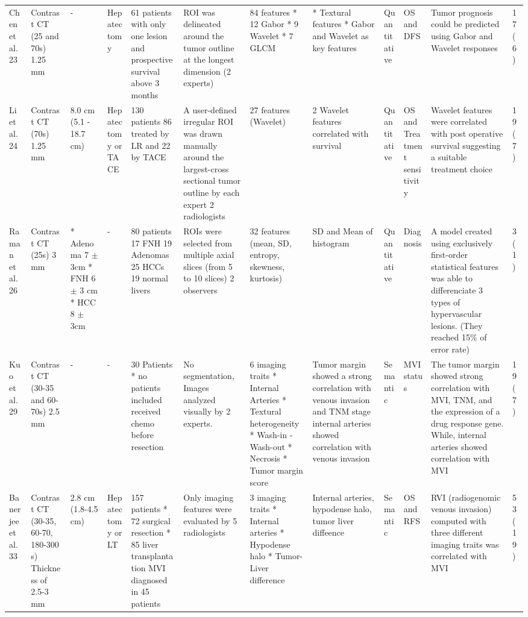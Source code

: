 \begin{landscape}
\begin{longtable}{p{2cm}|p{1.5cm}p{1cm}p{2cm}p{2cm}p{2cm}p{2cm}p{2cm}p{2cm}p{1.5cm}p{2cm}p{1cm}}
Chen et al.  23 &Contrast CT (25 and 70s) 1.25 mm &- &Hepatectomy &61 patients with only one lesion and prospective survival above 3 months &ROI was delineated around the tumor outline at the longest dimension (2 experts) &84 features * 12 Gabor * 9 Wavelet * 7 GLCM &* Textural features * Gabor and Wavelet as key features &Quantitative &OS and DFS &Tumor prognosis could be predicted using Gabor and Wavelet responses &17 (6) \\
Li et al.  24 &Contrast CT (70s) 1.25 mm &8.0 cm (5.1 - 18.7 cm) &Hepatectomy or TACE &130 patients 86 treated by LR and 22 by TACE &A user-defined irregular ROI was drawn manually around the largest-cross sectional tumor outline by each expert 2 radiologists &27 features (Wavelet) &2 Wavelet features correlated with survival &Quantitative &OS and Treatment sensitivity &Wavelet features were correlated with post operative survival suggesting a suitable treatment choice &19 (7) \\
Raman et al.  26 &Contrast CT (25s) 3 mm &* Adenoma 7 $ \pm $ 3cm * FNH 6 $ \pm $ 3 cm * HCC 8 $ \pm $ 3cm &- &80 patients 17 FNH 19 Adenomas 25 HCCs 19 normal livers &ROIs were selected from multiple axial slices (from 5 to 10 slices) 2 observers &32 features (mean, SD, entropy, skewness, kurtosis) & SD and Mean of histogram &Quantitative &Diagnosis &A model created using exclusively first-order statistical features was able to differenciate 3 types of hypervascular lesions. (They reached 15\% of error rate) &3 (1) \\
Kuo et al.  29 &Contrast CT (30-35 and 60-70s) 2.5 mm &- &- &30 Patients * no patients included received chemo before resection &No segmentation, Images analyzed visually by 2 experts. &6 imaging traits * Internal Arteries * Textural heterogeneity * Wash-in - Wash-out * Necrosis * Tumor margin score &Tumor margin showed a strong correlation with venous invasion and TNM stage internal arteries showed correlation with venous invasion &Semantic &MVI status &The tumor margin showed strong correlation with MVI, TNM, and the expression of a drug response gene. While, internal arteries showed correlation with MVI &19 (7) \\
Banerjee et al.  33 &Contrast CT (30-35, 60-70, 180-300 s) Thickness of 2.5-3 mm &2.8 cm (1.8-4.5 cm) &Hepatectomy or LT &157 patients * 72 surgical resection * 85 liver transplantation MVI diagnosed in 45 patients &Only imaging features were evaluated by 5 radiologists &3 imaging traits * Internal arteries * Hypodense halo * Tumor-Liver difference &Internal arteries, hypodense halo, tumor liver diffeence &Semantic &OS and RFS &RVI (radiogenomic venous invasion) computed with three different imaging traits was correlated with MVI &53 (19) \\

\end{longtable}
\end{landscape}
